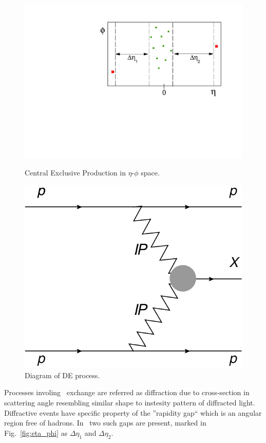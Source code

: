 \begin{figure}[b!]
\centering
\parbox{0.475\textwidth}{%
  \centering%
  \hspace*{-10pt}\includegraphics[width=1.1\linewidth]{graphics/introduction/eta_phi.pdf}\vspace*{-10pt}%
  \caption{Central Exclusive Production in $\eta$-$\phi$ space.\\}%
  \label{fig:eta_phi}%
}
\quad
\parbox{0.475\textwidth}{%
  \centering%
  \includegraphics[width=0.64\linewidth]{graphics/introduction/DPE.pdf}%
  \caption{Diagram of D\Pom E process.\\}%
  \label{fig:DPE}%
}\vspace*{-20pt}
\end{figure}

Processes involing \Pomeron\  exchange are referred as diffraction due to cross-section in scattering angle resembling similar shape to instesity pattern of diffracted light. Diffractive events have specific property of the ''rapidity gap`` which is an angular region free of hadrons. In \DPE\ two such gaps are present, marked in Fig.~\ref{fig:eta_phi} as $\Delta\eta_{1}$ and $\Delta\eta_{2}$.%

